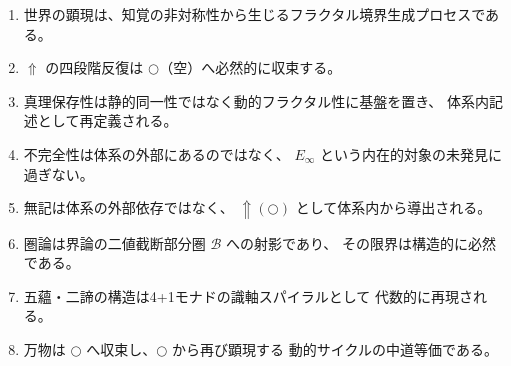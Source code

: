 \documentclass[11pt,a4paper]{ltjsarticle}
\newcommand{\metanegation}{\Uparrow}
\newcommand{\dfix}{\bigcirc}
\newcommand{\Einfty}{E_\infty}
\newcommand{\Bval}{\mathcal{B}}
\theoremstyle{definition}
\begin{document}
\begin{enumerate}[label=\textbf{\arabic*.}]
  \item 世界の顕現は、知覚の非対称性から生じるフラクタル境界生成プロセスである。
  \item $\metanegation$ の四段階反復は $\dfix$（空）へ必然的に収束する。
  \item 真理保存性は静的同一性ではなく動的フラクタル性に基盤を置き、
    体系内記述として再定義される。
  \item 不完全性は体系の外部にあるのではなく、
    $\Einfty$ という内在的対象の未発見に過ぎない。
  \item 無記は体系の外部依存ではなく、
    $\metanegation(\dfix)$ として体系内から導出される。
  \item 圏論は界論の二値截断部分圏 $\Bval$ への射影であり、
    その限界は構造的に必然である。
  \item 五蘊・二諦の構造は4+1モナドの識軸スパイラルとして
    代数的に再現される。
  \item 万物は $\dfix$ へ収束し、$\dfix$ から再び顕現する
    動的サイクルの中道等価である。
\end{enumerate}
\end{document}

